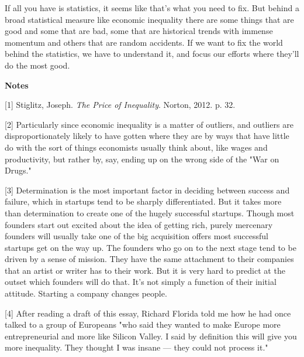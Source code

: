 If all you have is statistics, it seems like
                  that's what you need to fix. But behind a broad statistical
                  measure like economic inequality there are some things that
                  are good and some that are bad, some that are historical
                  trends with immense momentum and others that are random
                  accidents. If we want to fix the world behind the statistics,
                  we have to understand it, and focus our efforts where they'll
                  do the most good.









\textbf{Notes}

[1] Stiglitz, Joseph. \emph{The Price of Inequality}. Norton,
                  2012. p. 32.

[2] Particularly since economic inequality is a matter of
                  outliers, and outliers are disproportionately likely to have
                  gotten where they are by ways that have little do with the
                  sort of things economists usually think about, like wages and
                  productivity, but rather by, say, ending up on the wrong side
                  of the "War on Drugs."

[3] Determination is the most important factor in deciding
                  between success and failure, which in startups tend to be
                  sharply differentiated. But it takes more than determination
                  to create one of the hugely successful startups. Though most
                  founders start out excited about the idea of getting rich,
                  purely mercenary founders will usually take one of the big
                  acquisition offers most successful startups get on the way up.
                  The founders who go on to the next stage tend to be driven by
                  a sense of mission. They have the same attachment to their
                  companies that an artist or writer has to their work. But it
                  is very hard to predict at the outset which founders will do
                  that. It's not simply a function of their initial attitude.
                  Starting a company changes people.

[4] After reading a draft of this essay, Richard Florida told
                  me how he had once talked to a group of Europeans "who said
                  they wanted to make Europe more entrepreneurial and more like
                  Silicon Valley. I said by definition this will give you more
                  inequality. They thought I was insane --- they could not
                  process it."

